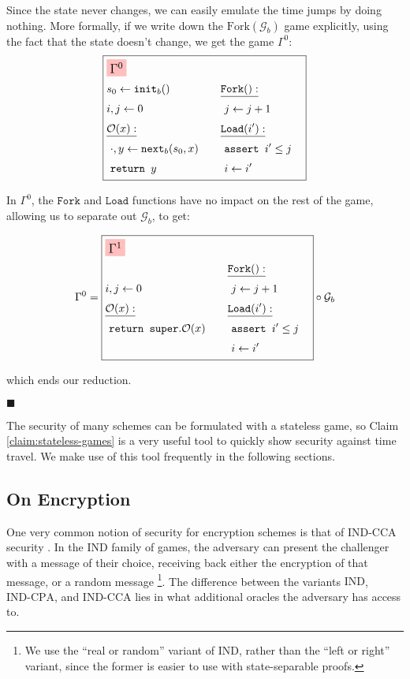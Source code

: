 Since the state never changes, we can easily emulate the time
jumps by doing nothing.
More formally, if we write down the $\text{Fork}(\mathcal{G}_b)$
game explicitly, using the fact that the state doesn't change, we get
the game $\Gamma^0$:
$$
\boxed{
\begin{aligned}
&\colorbox{pink}{\large $\Gamma^0$}\cr
&\begin{aligned}
    &s_0 \gets \texttt{init}_b()\cr
    &i, j \gets 0\cr
    &\underline{\mathcal{O}(x):}\cr
    &\ \cdot, y \gets \texttt{next}_b(s_0, x)\cr
    &\ \texttt{return } y\cr
\end{aligned}
&\begin{aligned}
    &\underline{\texttt{Fork}():}\cr
    &\ j \gets j + 1\cr
    &\underline{\texttt{Load}(i'):}\cr
    &\ \texttt{assert } i' \leq j\cr
    &\ i \gets i'\cr
\end{aligned}\cr
\end{aligned}
}
$$

In $\Gamma^0$, the $\texttt{Fork}$ and $\texttt{Load}$ functions have
no impact on the rest of the game, allowing us to separate out
$\mathcal{G}_b$, to get:

$$
\Gamma^0 = 
\boxed{
\begin{aligned}
&\colorbox{pink}{\large $\Gamma^1$}\cr
&\begin{aligned}
    &i, j \gets 0\cr
    &\underline{\mathcal{O}(x):}\cr
    &\ \texttt{return } \texttt{super}.\mathcal{O}(x)\cr
\end{aligned}
&\begin{aligned}
    &\underline{\texttt{Fork}():}\cr
    &\ j \gets j + 1\cr
    &\underline{\texttt{Load}(i'):}\cr
    &\ \texttt{assert } i' \leq j\cr
    &\ i \gets i'\cr
\end{aligned}\cr
\end{aligned}
} \circ \mathcal{G}_b
$$

which ends our reduction.

$\blacksquare$

The security of many schemes can be formulated with a stateless game,
so Claim \ref{claim:stateless-games} is a very useful tool
to quickly show security against time travel.
We make use of this tool frequently in the following sections.

\subsection{On Encryption}

One very common notion of security for encryption schemes is
that of $\text{IND-CCA}$ security \cite{ny90}.
In the $\text{IND}$ family of games, the adversary can present
the challenger with a message of their choice, receiving
back either the encryption of that message, or a random message
\footnote{We use the ``real or random'' variant of $\text{IND}$, rather than the ``left or right'' variant, since the former is easier to use with state-separable proofs.}.
The difference between the variants $\text{IND}$, $\text{IND-CPA}$, and $\text{IND-CCA}$
lies in what additional oracles the adversary has access to.

